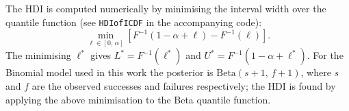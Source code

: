 The HDI is computed numerically by minimising the interval width over the quantile
function (see \texttt{HDIofICDF} in the accompanying code):
\begin{equation}
  \min_{\ell \in [0,\,\alpha]}\left[F^{-1}(1-\alpha+\ell) - F^{-1}(\ell)\right].
\end{equation}
The minimising $\ell^*$ gives $L^* = F^{-1}(\ell^*)$ and $U^* = F^{-1}(1-\alpha+\ell^*)$.
For the Binomial model used in this work the posterior is $\mathrm{Beta}(s+1,\,f+1)$,
where $s$ and $f$ are the observed successes and failures respectively; the HDI
is found by applying the above minimisation to the Beta quantile function.

